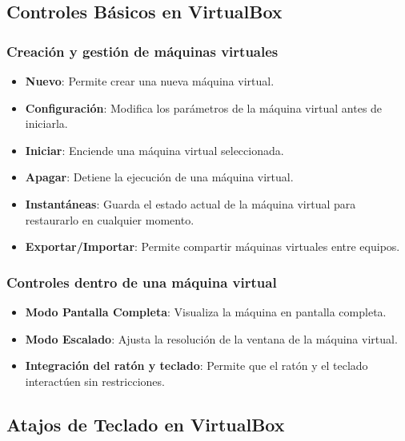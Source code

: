 \documentclass{article}
\begin{document}
\subsection{Controles Básicos en VirtualBox}

\subsubsection{Creación y gestión de máquinas virtuales}
\begin{itemize}
    \item \textbf{Nuevo}: Permite crear una nueva máquina virtual.
    \item \textbf{Configuración}: Modifica los parámetros de la máquina virtual antes de iniciarla.
    \item \textbf{Iniciar}: Enciende una máquina virtual seleccionada.
    \item \textbf{Apagar}: Detiene la ejecución de una máquina virtual.
    \item \textbf{Instantáneas}: Guarda el estado actual de la máquina virtual para restaurarlo en cualquier momento.
    \item \textbf{Exportar/Importar}: Permite compartir máquinas virtuales entre equipos.
\end{itemize}

\subsubsection{Controles dentro de una máquina virtual}
\begin{itemize}
    \item \textbf{Modo Pantalla Completa}: Visualiza la máquina en pantalla completa.
    \item \textbf{Modo Escalado}: Ajusta la resolución de la ventana de la máquina virtual.
    \item \textbf{Integración del ratón y teclado}: Permite que el ratón y el teclado interactúen sin restricciones.
\end{itemize}

\subsection{Atajos de Teclado en VirtualBox}
\end{document}
